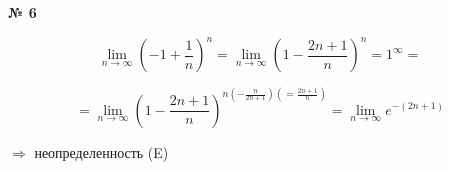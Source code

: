 \documentclass{article}
\begin{document}
\textbf{№ 6} 

\begingroup
\Large

$$ \lim\limits_{n\to \infty} \left( -1 + \frac{1}{n} \right)^{n}
= \lim\limits_{n\to \infty} \left( 1 - \frac{2n+1}{n} \right)^{n}
= 1^{\infty}
= $$

$$ = \lim\limits_{n\to \infty} \left( 1 - \frac{2n+1}{n} \right)^{n (-\frac{n}{2n+1}) (=\frac{2n+1}{n})}
= \lim\limits_{n\to \infty} e^{-(2n+1)}$$

$\Rightarrow$ неопределенность (E)

\endgroup
\end{document}
